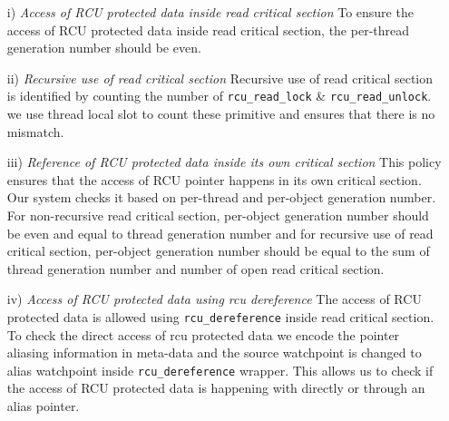 \begin{enumerate}
\item[i)] \emph{Access of RCU protected data inside read critical section} To ensure the access of RCU protected data inside read critical section, the per-thread generation number should be even.%
\item[ii)] \emph{Recursive use of read critical section} Recursive use of read critical section is identified by counting the number of \texttt{rcu\_read\_lock} \& \texttt{rcu\_read\_unlock}. we use thread local slot to count these primitive and ensures that there is no mismatch.
\item[iii)] \emph{ Reference of RCU protected data inside its own critical section} This policy ensures that the access of RCU pointer happens in its own critical section. Our system checks it based on per-thread and per-object generation number. For non-recursive read critical section, per-object generation number should be even and equal to thread generation number and for recursive use of read critical section, per-object generation number should be equal to the sum of thread generation number and number of open read critical section.
\item[iv)] \emph{Access of RCU protected data using rcu dereference} The access of RCU protected data is allowed using \texttt{rcu\_dereference} inside read critical section. To check the direct access of rcu protected data we encode the pointer aliasing information in meta-data and the source watchpoint is changed to alias watchpoint inside \texttt{rcu\_dereference} wrapper. This allows us to check if the access of RCU protected data is happening with directly or through an alias pointer.

\end{enumerate}
